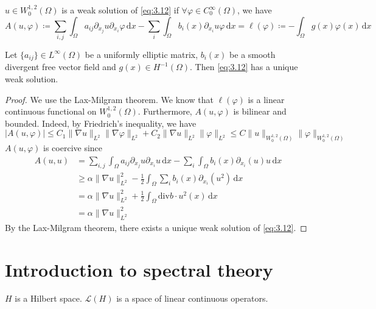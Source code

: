 \documentclass{report}
\begin{document}
\begin{definition}{}{}
    \(u \in W^{1, 2}_{0}(\Omega)\) is a weak solution of \ref{eq:3.12} if \(\forall \varphi \in C^{\infty}_{0}(\Omega)\), we have 
    \[
        A(u, \varphi) \coloneqq \sum_{i, j} \int_{\Omega} a_{ij} \partial_{x_{j}}u \partial_{x_{i}}\varphi \,\mathrm{d}x - \sum_{i} \int_{\Omega} b_{i}(x) \partial_{x_{i}} u \varphi \,\mathrm{d}x = \ell(\varphi) \coloneqq - \int_{\Omega} g(x)\varphi(x) \,\mathrm{d}x
    \]
\end{definition}

\begin{theorem}{}{}
    Let \(\{a_{ij}\} \in L^{\infty}(\Omega)\) be a uniformly elliptic matrix, \(b_{i}(x)\) be a smooth divergent free vector field and \(g(x) \in H^{-1}(\Omega)\). Then \ref{eq:3.12} has a unique weak solution.
\end{theorem}

\begin{proof}
    We use the Lax-Milgram theorem. We know that \(\ell(\varphi)\) is a linear continuous functional on \(W^{1, 2}_{0}(\Omega)\). Furthermore, \(A(u, \varphi)\) is bilinear and bounded. Indeed, by Friedrich's inequality, we have
    \[
        \vert A(u, \varphi) \vert \leq C_{1}\|\nabla u\|_{L^{2}} \|\nabla \varphi\|_{L^{2}} + C_2\|\nabla u\|_{L^{2}}\|\varphi\|_{L^{2}} \leq C\|u\|_{W^{1, 2}_{0}(\Omega)}\|\varphi\|_{W^{1, 2}_{0}(\Omega)}
    \]
    \(A(u, \varphi)\) is coercive since 
    \begin{align*}
        A(u, u) &= \sum_{i, j} \int_{\Omega} a_{ij} \partial_{x_{j}}u \partial_{x_{i}}u \,\mathrm{d}x - \sum_{i} \int_{\Omega} b_{i}(x) \partial_{x_{i}} (u) u \,\mathrm{d}x \\
        &\geq \alpha \|\nabla u\|_{L^{2}}^{2} - \frac{1}{2}\int_{\Omega} \sum_{i} b_{i}(x) \partial_{x_{i}} (u^{2}) \,\mathrm{d}x \\
        &= \alpha \|\nabla u\|_{L^{2}}^{2} + \frac{1}{2} \int_{\Omega} \text{div}b \cdot u^{2}(x) \,\mathrm{d}x \\
        &= \alpha\|\nabla u\|_{L^{2}}^{2}
    \end{align*}
    By the Lax-Milgram theorem, there exists a unique weak solution of \ref{eq:3.12}.
\end{proof}

\section{Introduction to spectral theory}
\(H\) is a Hilbert space. \(\mathcal{L}(H)\) is a space of linear continuous operators.
\end{document}
